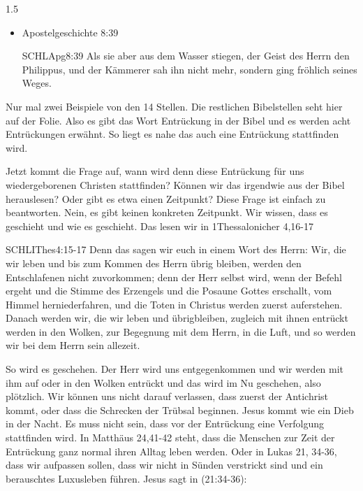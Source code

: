 \documentclass[14pt]{../../inc/mybib}
\begin{document}
\begin{spacing}{1.5}
\begin{block}
\begin{itemize}
\begin{bibelbox}{SCHL}{Matt}{11:12}
                  \end{bibelbox}
            \item Apostelgeschichte 8:39
                  \begin{bibelbox}{SCHL}{Apg}{8:39}
                      Als sie aber aus dem Wasser stiegen,  der Geist des Herrn den Philippus, und der Kämmerer sah ihn nicht mehr, sondern ging fröhlich seines Weges.
                  \end{bibelbox}
        \end{itemize}
        Nur mal zwei Beispiele von den 14 Stellen. Die restlichen Bibelstellen seht hier auf der Folie. Also es gibt das Wort Entrückung in der Bibel und es werden acht Entrückungen erwähnt. So liegt es nahe das auch eine Entrückung stattfinden wird.

        Jetzt kommt die Frage auf, wann wird denn diese Entrückung für uns wiedergeborenen Christen stattfinden? Können wir das irgendwie aus der Bibel herauslesen? Oder gibt es etwa einen Zeitpunkt? Diese Frage ist einfach zu beantworten. Nein, es gibt keinen konkreten Zeitpunkt. Wir wissen, dass es geschieht und wie es geschieht. Das lesen wir in 1Thessalonicher 4,16-17
        \begin{bibelbox}{SCHL}{IThes}{4:15-17}
            Denn das sagen wir euch in einem Wort des Herrn: Wir, die wir leben und bis zum Kommen des Herrn übrig bleiben, werden den Entschlafenen nicht zuvorkommen; denn der Herr selbst wird, wenn der Befehl ergeht und die Stimme des Erzengels und die Posaune Gottes erschallt, vom Himmel herniederfahren, und die Toten in Christus werden zuerst auferstehen. Danach werden wir, die wir leben und übrigbleiben, zugleich mit ihnen entrückt werden in den Wolken, zur Begegnung mit dem Herrn, in die Luft, und so werden wir bei dem Herrn sein allezeit.
        \end{bibelbox}
        So wird es geschehen. Der Herr wird uns entgegenkommen und wir werden mit ihm auf oder in den Wolken entrückt und das wird im Nu geschehen, also plötzlich. Wir können uns nicht darauf verlassen, dass zuerst der Antichrist kommt, oder dass die Schrecken der Trübsal beginnen. Jesus kommt wie ein Dieb in der Nacht.
        Es muss nicht sein, dass vor der Entrückung eine Verfolgung stattfinden wird. In Matthäus 24,41-42 steht, dass die Menschen zur Zeit der Entrückung ganz normal ihren Alltag leben werden. Oder in Lukas 21, 34-36, dass wir aufpassen sollen, dass wir nicht in Sünden verstrickt sind und ein berauschtes Luxusleben führen.
        Jesus sagt in (21:34-36):

\end{block}
\end{spacing}
\end{document}
